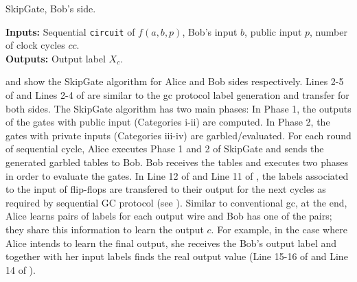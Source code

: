 \begin{algorithm}[]
\caption{SkipGate, Bob's side.}\label{alg:bob}
\textbf{Inputs:} Sequential \texttt{circuit} of $f(a,b,p)$, Bob's input $b$, public input $p$, number of clock cycles $cc$.\\
\textbf{Outputs:} Output label $X_c$.\\
\begin{algorithmic}[1]
\ENDFOR
{}
\end{algorithmic}
\end{algorithm}

 and  show the SkipGate algorithm for Alice and Bob sides respectively.
Lines 2-5 of  and Lines 2-4 of  are similar to the \acrshort{gc} protocol label generation and transfer for both sides.
The SkipGate algorithm has two main phases:
In Phase 1, the outputs of the gates with public input (Categories i-ii) are computed.
In Phase 2, the gates with private inputs (Categories iii-iv) are  garbled/evaluated.
For each round of sequential cycle, Alice executes Phase 1 and 2 of SkipGate and sends the generated garbled tables to Bob.
Bob receives the tables and executes two phases in order to evaluate the gates.
In Line 12 of  and Line 11 of , the labels associated to the input of flip-flops are transfered to their output for the next cycles as required by sequential GC protocol (see ).
Similar to conventional \acrshort{gc}, at the end, Alice learns pairs of labels for each output wire and Bob has one of the pairs; they share this information to learn the output $c$.
For example, in the case where Alice intends to learn the final output, she receives the Bob's output label and together with her input labels finds the real output value (Line 15-16 of  and Line 14 of ).

